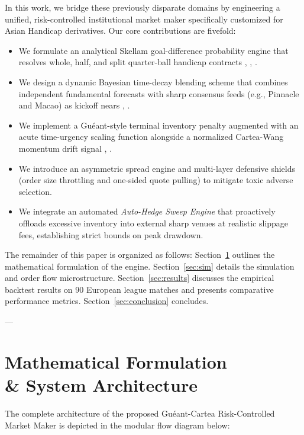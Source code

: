 \documentclass[10pt,twocolumn]{article}
\begin{document}
In this work, we bridge these previously disparate domains by engineering a unified, risk-controlled institutional market maker specifically customized for Asian Handicap derivatives. Our core contributions are fivefold:
\begin{itemize}
    \item We formulate an analytical Skellam goal-difference probability engine that resolves whole, half, and split quarter-ball handicap contracts \cite{11}, \cite{12}, \cite{13}.
    \item We design a dynamic Bayesian time-decay blending scheme that combines independent fundamental forecasts with sharp consensus feeds (e.g., Pinnacle and Macao) as kickoff nears \cite{6}, \cite{16}.
    \item We implement a Guéant-style terminal inventory penalty augmented with an acute time-urgency scaling function alongside a normalized Cartea-Wang momentum drift signal \cite{1}, \cite{2}.
    \item We introduce an asymmetric spread engine and multi-layer defensive shields (order size throttling and one-sided quote pulling) to mitigate toxic adverse selection.
    \item We integrate an automated \textit{Auto-Hedge Sweep Engine} that proactively offloads excessive inventory into external sharp venues at realistic slippage fees, establishing strict bounds on peak drawdown.
\end{itemize}

The remainder of this paper is organized as follows: Section~\ref{sec:math} outlines the mathematical formulation of the engine. Section~\ref{sec:sim} details the simulation and order flow microstructure. Section~\ref{sec:results} discusses the empirical backtest results on 90 European league matches and presents comparative performance metrics. Section~\ref{sec:conclusion} concludes.

---

\section[Mathematical Formulation \& System Architecture]{Mathematical Formulation \\ \& System Architecture}
\label{sec:math}

The complete architecture of the proposed Guéant-Cartea Risk-Controlled Market Maker is depicted in the modular flow diagram below:
\end{document}
